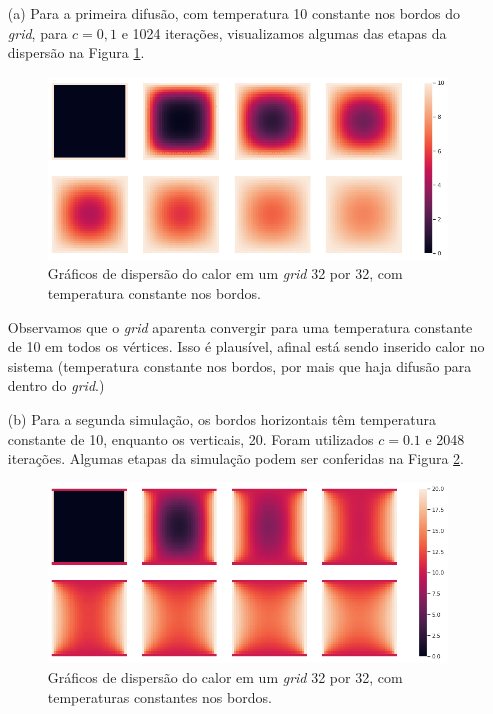 \documentclass{article}
\begin{document}
        \begin{itemize}
            \item[(a)] Para a primeira difusão, com temperatura 10 constante nos bordos do \textit{grid},
                para $c=0,1$ e 1024 iterações, visualizamos algumas das etapas da dispersão na Figura \ref{fig:graph_1}.
                
                \begin{figure}[!h]
                    \includegraphics[width=\textwidth]{graph_1.png}
                    \caption{Gráficos de dispersão do calor em um \textit{grid} 32 por 32, com temperatura constante nos bordos.}
                    \label{fig:graph_1}
                \end{figure}

                Observamos que o \textit{grid} aparenta convergir para uma temperatura constante de 10 em todos os vértices.
                Isso é plausível, afinal está sendo inserido calor no sistema (temperatura constante nos bordos, por mais que haja difusão
                para dentro do \textit{grid}.)

            \item[(b)] Para a segunda simulação, os bordos horizontais têm temperatura constante de 10,
                enquanto os verticais, 20. Foram utilizados $c=0.1$ e 2048 iterações. Algumas etapas da simulação
                podem ser conferidas na Figura \ref{fig:graph_2}.
                
                \begin{figure}[!h]
                    \includegraphics[width=\textwidth]{graph_2.png}
                    \caption{Gráficos de dispersão do calor em um \textit{grid} 32 por 32, com temperaturas constantes nos bordos.}
                    \label{fig:graph_2}
                \end{figure}


\end{itemize}
\end{document}

